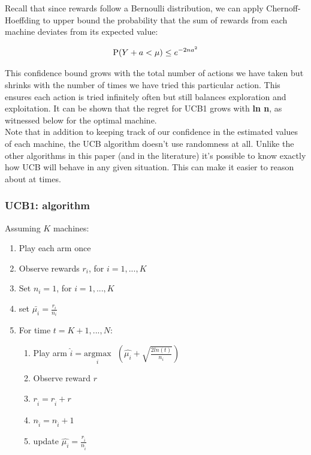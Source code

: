 \documentclass{article}
\begin{document}
Recall that since rewards follow a Bernoulli distribution, we can apply Chernoff-Hoeffding to upper bound the probability that the sum of rewards from each machine deviates from its expected value:

$$\displaystyle \textup{P}(Y + a < \mu) \leq e^{-2na^2}$$

This confidence bound grows with the total number of actions we have taken but shrinks with the number of times we have tried this particular action. This ensures each action is tried infinitely often but still balances exploration and exploitation. It can be shown that the regret for UCB1 grows with \textbf{ln n}, as witnessed below for the optimal machine.\\

Note that in addition to keeping track of our confidence in the estimated values of each machine, the UCB algorithm doesn’t use randomness at all. Unlike the other algorithms in this paper (and in the literature) it’s possible to know exactly how UCB will behave in any given situation. This can make it easier to reason about at times.

\subsubsection{UCB1: algorithm}

Assuming $K$ machines:

\begin{enumerate}
\item Play each arm once
\item Observe rewards $r_i$, for $i = 1, ..., K$
\item Set $n_i = 1$, for $i = 1, ..., K$
\item set $\bar{\mu_{i}} = \frac{r_i}{n_i}$
\item For time $t = K+1, ..., N$:
	\begin{enumerate}
		\item Play arm $\hat{i} = \underset{i}{\text{argmax}}\text{ }(\hat{\mu_{i}} + \sqrt{\frac{2 ln (t)}{n_i}})$
		\item Observe reward $r$
		\item $r_{\hat{i}} = r_{\hat{i}} + r$
		\item $n_{\hat{i}} = n_{\hat{i}} + 1$
		\item update $\hat{\mu_{i}} = \frac{r_{\hat{i}}}{n_{\hat{i}}}$
	\end{enumerate}
\end{enumerate}
\end{document}
